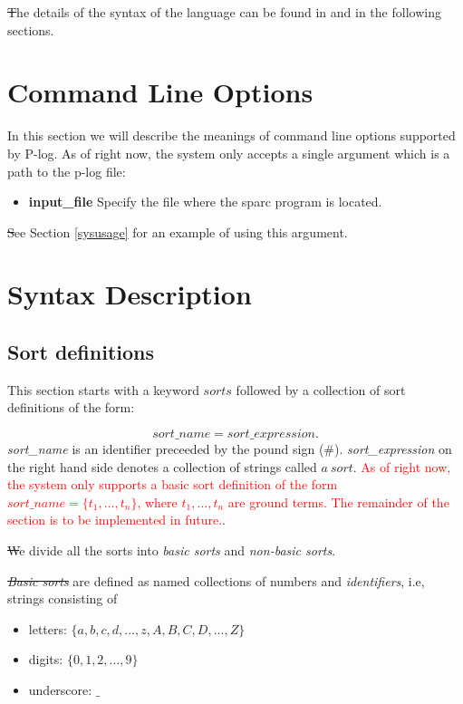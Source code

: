 \documentclass[12pt, letterpaper]{article}
\begin{document}
\st
The details of the syntax of the language can be found in \cite{Balai2019} and in the following sections. 

\section{Command Line Options}\label{option}

In this section we will describe the meanings of command line options supported by
P-log. As of right now, the system only accepts a single argument which is a path to the p-log file: 
\begin{itemize}
\item \textbf{input\_file} Specify the file where the sparc program is located.

\end{itemize}

\st
See Section \ref{sysusage} for an example of using this argument.


\section{Syntax Description}


\subsection{Sort definitions}\label{ss}


This section starts with a keyword $sorts$ followed by a collection of sort definitions of the form: 

\begin{equation*}
  sort\_name=sort\_expression.
\end{equation*}
\textit{sort\_name} is an identifier preceeded by the pound sign (\#).
\textit{sort\_expression}  on the right hand side denotes a collection of strings called $a~sort$.
\textcolor{red}{As of right now, the system only supports a basic sort definition of the form $sort\_name = \{t_1,\ldots,t_n\}$, where $t_1,\ldots,t_n$
  are ground terms. The remainder of the section is to be implemented in future.}.
  
\st
We divide all the sorts into \textit{basic sorts} and \textit{non-basic sorts}. 

\st \textit{Basic sorts} are defined as named collections of numbers and \textit{identifiers}, i.e, strings consisting of

\begin{itemize}

 \item letters: $\{a,b,c,d,...,z,A,B,C,D,...,Z\}$

 \item digits: $\{0,1,2,...,9\}$

 \item underscore: $\_$

\end{itemize}
\end{document}
